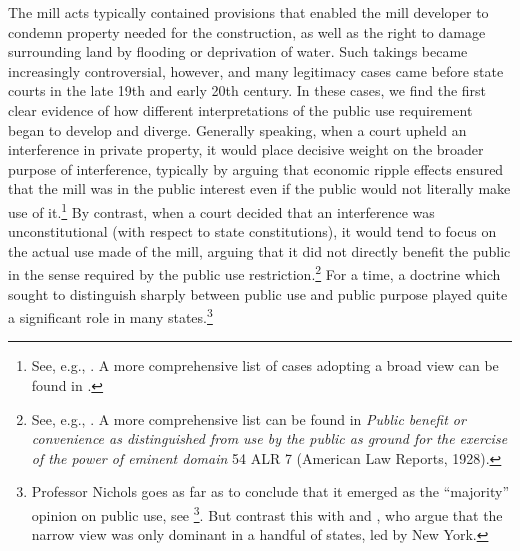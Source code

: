 The mill acts typically contained provisions that enabled the mill developer to condemn property needed for the construction, as well as the right to damage surrounding land by flooding or deprivation of water. Such takings became increasingly controversial, however, and many legitimacy cases came before state courts in the late 19th and early 20th century. In these cases, we find the first clear evidence of how different interpretations of the public use requirement began to develop and diverge. Generally speaking, when a court upheld an interference in private property, it would place decisive weight on the broader purpose of interference, typically by arguing that economic ripple effects ensured that the mill was in the public interest even if the public would not literally make use of it.\footnote{See, e.g., \cite{hazen83,scudder32,boston32}. A more comprehensive list of cases adopting a broad view can be found in \cite[617]{nichols40}.} By contrast, when a court decided that an interference was unconstitutional (with respect to state constitutions), it would tend to focus on the actual use made of the mill, arguing that it did not directly benefit the public in the sense required by the public use restriction.\footnote{See, e.g., \cite{sadler59,ryerson77,gaylord03,minn06}. A more comprehensive list can be found in {\it Public benefit or convenience as distinguished from use by the public as ground for the exercise of the power of eminent domain} 54 ALR 7 (American Law Reports, 1928).} For a time, a doctrine which sought to distinguish sharply between public use and public purpose played quite a significant role in many states.\footnote{Professor Nichols goes as far as to conclude that it emerged as the ``majority'' opinion on public use, see \footcite[617-618]{nichols40}. But contrast this with \cite{berger78} and \cite{meidinger80}, who argue that the narrow view was only dominant in a handful of states, led by New York.}


